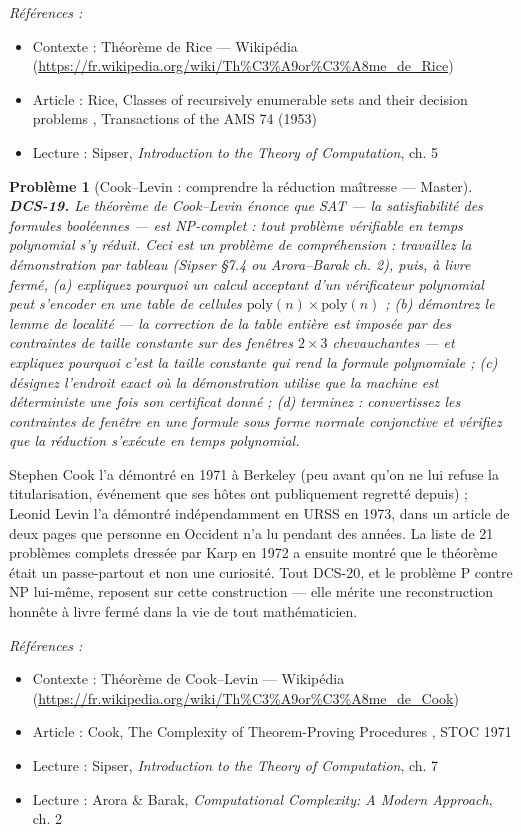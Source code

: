 \documentclass[11pt]{article}
\newtheorem{problem}{Problème}
\newenvironment{refs}{\par\small\noindent\emph{Références :}\begin{itemize}\setlength\itemsep{0pt}}{\end{itemize}\normalsize}
\begin{document}
\begin{refs}
\item Contexte : Théorème de Rice --- Wikipédia (\url{https://fr.wikipedia.org/wiki/Th%C3%A9or%C3%A8me_de_Rice})
\item Article : Rice, \og{} Classes of recursively enumerable sets and their decision problems \fg{}, Transactions of the AMS 74 (1953)
\item Lecture : Sipser, \textit{Introduction to the Theory of Computation}, ch. 5
\end{refs}

\bigskip

\begin{problem}[{Cook--Levin : comprendre la réduction maîtresse --- Master}]
\textbf{DCS-19.} Le théorème de Cook--Levin énonce que SAT --- la satisfiabilité des formules booléennes --- est NP-complet : tout problème vérifiable en temps polynomial s'y réduit. Ceci est un problème de compréhension : travaillez la démonstration par tableau (Sipser \S{}7.4 ou Arora--Barak ch. 2), puis, à livre fermé, (a) expliquez pourquoi un calcul acceptant d'un vérificateur polynomial peut s'encoder en une table de cellules $\text{poly}(n) \times \text{poly}(n)$ ; (b) démontrez le lemme de localité --- la correction de la table entière est imposée par des contraintes de taille constante sur des fenêtres $2 \times 3$ chevauchantes --- et expliquez pourquoi c'est la taille constante qui rend la formule polynomiale ; (c) désignez l'endroit exact où la démonstration utilise que la machine est déterministe une fois son certificat donné ; (d) terminez : convertissez les contraintes de fenêtre en une formule sous forme normale conjonctive et vérifiez que la réduction s'exécute en temps polynomial.
\end{problem}

\noindent Stephen Cook l'a démontré en 1971 à Berkeley (peu avant qu'on ne lui refuse la titularisation, événement que ses hôtes ont publiquement regretté depuis) ; Leonid Levin l'a démontré indépendamment en URSS en 1973, dans un article de deux pages que personne en Occident n'a lu pendant des années. La liste de 21 problèmes complets dressée par Karp en 1972 a ensuite montré que le théorème était un passe-partout et non une curiosité. Tout DCS-20, et le problème P contre NP lui-même, reposent sur cette construction --- elle mérite une reconstruction honnête à livre fermé dans la vie de tout mathématicien.

\begin{refs}
\item Contexte : Théorème de Cook--Levin --- Wikipédia (\url{https://fr.wikipedia.org/wiki/Th%C3%A9or%C3%A8me_de_Cook})
\item Article : Cook, \og{} The Complexity of Theorem-Proving Procedures \fg{}, STOC 1971
\item Lecture : Sipser, \textit{Introduction to the Theory of Computation}, ch. 7
\item Lecture : Arora \& Barak, \textit{Computational Complexity: A Modern Approach}, ch. 2
\end{refs}
\end{document}
